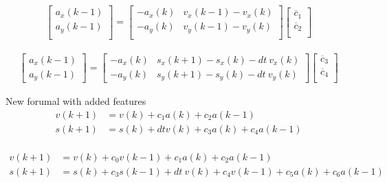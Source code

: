 \documentclass[10pt]{article}         %
\begin{document}
\begin{align}
    \begin{bmatrix}
        a_x(k-1) \\ 
        a_y(k-1) \\ 
    \end{bmatrix}
    =
    \begin{bmatrix}
        -a_x(k)  & v_x(k-1) - v_x(k)   \\ 
        -a_y(k)  & v_y(k-1) - v_y(k)   \\
    \end{bmatrix}
    \begin{bmatrix}
        \overline c_1 \\
        \overline c_2 \\
   \end{bmatrix}
\end{align}



\begin{align}
    \begin{bmatrix}
        a_x(k-1) \\ 
        a_y(k-1)       
    \end{bmatrix}
    =
    \begin{bmatrix}
        -a_x(k) &    s_x(k+1) - s_x(k) - dt \  v_x(k)   \\ 
        -a_y(k) &    s_y(k+1) - s_y(k) - dt \  v_y(k)
    \end{bmatrix}
    \begin{bmatrix}
        \overline c_3 \\
        \overline c_4 \\
   \end{bmatrix}
\end{align}

New forumal with added features
\begin{align}
v(k+1) &= v(k) + c_1 a(k) + c_2 a(k-1) \\
s(k+1) &= s(k) + dt v(k) + c_3 a(k) + c_4 a(k-1) \\
\end{align}



\begin{align}
v(k+1) &= v(k) + c_0 v(k-1) + c_1 a(k) + c_2 a(k-1) \\
s(k+1) &= s(k) + c_3 s(k-1) + dt \  v(k) + c_4v(k-1) + c_5 a(k) + c_6 a(k-1) \\
\end{align}
\end{document}
